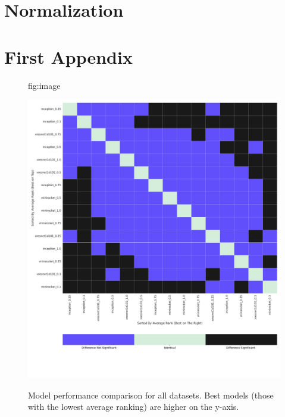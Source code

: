 \documentclass[pmlr,twocolumn]{jmlr}%
\begin{document}
\section{Normalization}
\label{sec:Norm}




\appendix
\section{First Appendix}\label{apd:model_vs_model}
\begin{figure}[tbp]
\floatconts
  {fig:image}
  {\caption{Model performance comparison for all datasets. Best models (those with the lowest average ranking) are higher on the y-axis.}}
  {\includegraphics[width=1\linewidth]{images/model_comparisons_alldatasets.pdf}}
 
\end{figure}
\end{document}
